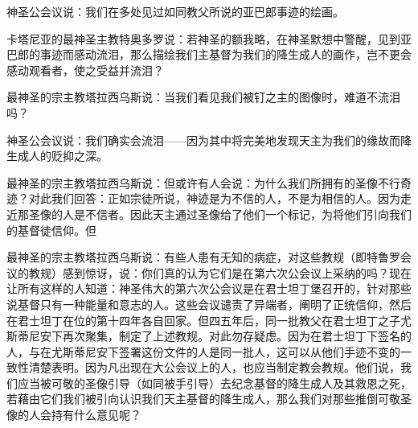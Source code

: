 神圣公会议说：我们在多处见过如同教父所说的亚巴郎事迹的绘画。\par

卡塔尼亚的最神圣主教特奥多罗说：若神圣的额我略，在神圣默想中警醒，见到亚巴郎的事迹而感动流泪，那么描绘我们主基督为我们的降生成人的画作，岂不更会感动观看者，使之受益并流泪？\par

最神圣的宗主教塔拉西乌斯说：当我们看见我们被钉之主的图像时，难道不流泪吗？\par

神圣公会议说：我们确实会流泪——因为其中将完美地发现天主为我们的缘故而降生成人的贬抑之深。\par

\par

最神圣的宗主教塔拉西乌斯说：但或许有人会说：为什么我们所拥有的圣像不行奇迹？对此我们回答：正如宗徒所说，神迹是为不信的人，不是为相信的人。因为走近那圣像的人是不信者。因此天主通过圣像给了他们一个标记，为将他们引向我们的基督徒信仰。但\par

\par

最神圣的宗主教塔拉西乌斯说：有些人患有无知的病症，对这些教规（即特鲁罗会议的教规）感到惊讶，说：你们真的认为它们是在第六次公会议上采纳的吗？现在让所有这样的人知道：神圣伟大的第六次公会议是在君士坦丁堡召开的，针对那些说基督只有一种能量和意志的人。这些会议谴责了异端者，阐明了正统信仰，然后在君士坦丁在位的第十四年各自回家。但四五年后，同一批教父在君士坦丁之子尤斯蒂尼安下再次聚集，制定了上述教规。对此勿存疑虑。因为在君士坦丁下签名的人，与在尤斯蒂尼安下签署这份文件的人是同一批人，这可以从他们手迹不变的一致性清楚表明。因为凡出现在大公会议上的人，也应当制定教会教规。他们说，我们应当被可敬的圣像引导（如同被手引导）去纪念基督的降生成人及其救恩之死，若藉由它们我们被引向认识我们天主基督的降生成人，那么我们对那些推倒可敬圣像的人会持有什么意见呢？\par

\par

